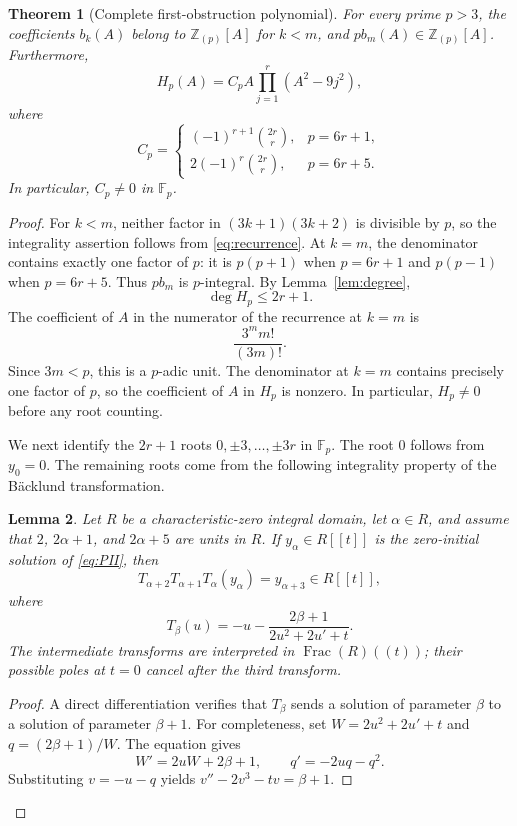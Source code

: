 \documentclass[11pt,a4paper,reqno]{amsart}
\newtheorem{theorem}{Theorem}[section]
\newtheorem{lemma}[theorem]{Lemma}
\theoremstyle{definition}
\theoremstyle{remark}
\newcommand{\Z}{\mathbb Z}
\newcommand{\F}{\mathbb F}
\begin{document}
\begin{theorem}[Complete first-obstruction polynomial]\label{thm:Hp}
For every prime $p>3$, the coefficients $b_k(A)$ belong to $\Z_{(p)}[A]$ for $k<m$, and $p b_m(A)\in\Z_{(p)}[A]$. Furthermore,
\begin{equation}\label{eq:Hp}
 \boxed{
 H_p(A)=C_p A\prod_{j=1}^{r}(A^2-9j^2),
 }
\end{equation}
where
\[
 C_p=
 \begin{cases}
 (-1)^{r+1}\displaystyle\binom{2r}{r},&p=6r+1,\\[2mm]
 2(-1)^r\displaystyle\binom{2r}{r},&p=6r+5.
 \end{cases}
\]
In particular, $C_p\ne0$ in $\F_p$.
\end{theorem}

\begin{proof}
For $k<m$, neither factor in $(3k+1)(3k+2)$ is divisible by $p$, so the integrality assertion follows from \eqref{eq:recurrence}. At $k=m$, the denominator contains exactly one factor of $p$: it is $p(p+1)$ when $p=6r+1$ and $p(p-1)$ when $p=6r+5$. Thus $p b_m$ is $p$-integral. By Lemma~\ref{lem:degree},
\[
 \deg H_p\le 2r+1.
\]
The coefficient of $A$ in the numerator of the recurrence at
$k=m$ is
\[
\frac{3^m m!}{(3m)!}.
\]
Since $3m<p$, this is a $p$-adic unit. The denominator at $k=m$
contains precisely one factor of $p$, so the coefficient of $A$ in
$H_p$ is nonzero. In particular, $H_p\ne0$ before any root counting.

We next identify the $2r+1$ roots $0,\pm3,\ldots,\pm3r$ in $\F_p$. The root $0$ follows from $y_0=0$. The remaining roots come from the following integrality property of the B\"acklund transformation.

\begin{lemma}\label{lem:BT}
Let $R$ be a characteristic-zero integral domain, let $\alpha\in R$, and assume that $2$, $2\alpha+1$, and $2\alpha+5$ are units in $R$. If $y_\alpha\in R[[t]]$ is the zero-initial solution of \eqref{eq:PII}, then
\[
 T_{\alpha+2}T_{\alpha+1}T_\alpha(y_\alpha)=y_{\alpha+3}\in R[[t]],
\]
where
\[
 T_\beta(u)=-u-\frac{2\beta+1}{2u^2+2u'+t}.
\]
The intermediate transforms are interpreted in $\operatorname{Frac}(R)((t))$; their possible poles at $t=0$ cancel after the third transform.
\end{lemma}

\begin{proof}
A direct differentiation verifies that $T_\beta$ sends a solution of parameter $\beta$ to a solution of parameter $\beta+1$. For completeness, set $W=2u^2+2u'+t$ and $q=(2\beta+1)/W$. The equation gives
\[
 W'=2uW+2\beta+1,\qquad q'=-2uq-q^2.
\]
Substituting $v=-u-q$ yields $v''-2v^3-tv=\beta+1$.


\end{proof}
\end{proof}
\end{document}
